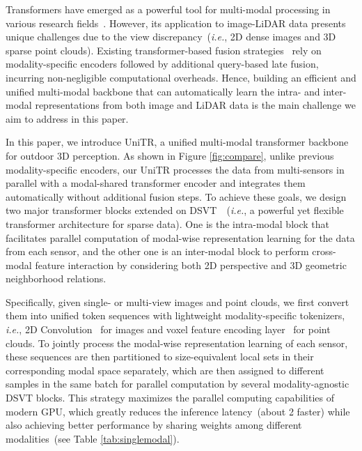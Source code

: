 \documentclass[10pt,twocolumn,letterpaper]{article}
\begin{document}
Transformers have emerged as a powerful tool for multi-modal processing in various research fields~\cite{chen2020uniter,li2019visualbert,shi2022motion,zhu2022uni}.
However, its application to image-LiDAR data presents unique challenges due to the view discrepancy~(\textit{i.e.}, 2D dense images and 3D sparse point clouds). Existing transformer-based fusion strategies~\cite{bai2022transfusion,chen2022futr3d,li2022unifying} rely on modality-specific encoders followed by additional query-based late fusion, incurring non-negligible computational overheads. Hence, building an efficient and unified multi-modal backbone that can automatically learn the intra- and inter-modal representations from both image and LiDAR data is the main challenge we aim to address in this paper.
    
In this paper, we introduce UniTR, a unified multi-modal transformer backbone for outdoor 3D perception. As shown in Figure \ref{fig:compare}, unlike previous modality-specific encoders, our UniTR processes the data from multi-sensors in parallel with a modal-shared transformer encoder and integrates them automatically without additional fusion steps. To achieve these goals, we design two major transformer blocks extended on DSVT~\cite{wang2023dsvt}~(\textit{i.e.}, a powerful yet flexible transformer architecture for sparse data). One is the intra-modal block that facilitates parallel computation of modal-wise representation learning for the data from each sensor, and the other one is an inter-modal block to perform cross-modal feature interaction by considering both 2D perspective and 3D geometric neighborhood relations. 

Specifically, given single- or multi-view images and point clouds,  we first convert them into unified token sequences with lightweight modality-specific tokenizers, \textit{i.e.}, 2D Convolution~\cite{krizhevsky2017imagenet} for images and voxel feature encoding layer~\cite{zhou2020end} for point clouds. To jointly process the modal-wise representation learning of each sensor, these sequences are then partitioned to size-equivalent local sets in their corresponding modal space separately, which are then assigned to different samples in the same batch for parallel computation by several modality-agnostic DSVT blocks. This strategy maximizes the parallel computing capabilities of modern GPU, which greatly reduces the inference latency~(about 2 faster) 
 while also achieving better performance by sharing weights among different modalities~(see Table \ref{tab:singlemodal}). 
\end{document}
